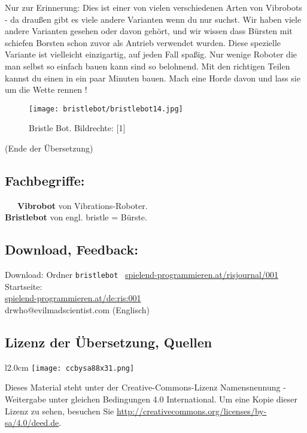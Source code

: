 \documentclass[10pt,a4paper,ngerman,twoside]{article} %
\begin{document}
Nur zur Erinnerung: Dies ist einer von vielen verschiedenen Arten von Vibrobots - da draußen gibt es viele andere Varianten wenn du nur suchst. Wir haben viele andere Varianten gesehen oder davon gehört, und wir wissen dass Bürsten mit schiefen Borsten schon zuvor als Antrieb verwendet wurden. Diese spezielle Variante ist vielleicht einzigartig, auf jeden Fall spaßig. Nur wenige Roboter die man selbst so einfach bauen kann sind so belohnend. Mit den richtigen Teilen kannst du einen in ein paar Minuten bauen. Mach eine Horde davon und lass sie um die Wette rennen !
\
\begin{figure}
\texttt{[image: bristlebot/bristlebot14.jpg]}
\caption{Bristle Bot. Bildrechte: [1]}
\end{figure}

(Ende der Übersetzung) \\

\subsection*{Fachbegriffe:}

~~~\textbf{Vibrobot} von Vibrations-Roboter. \\

\textbf{Bristlebot} von engl. bristle = Bürste. \\

\newpage
\subsection*{Download, Feedback:}
\footnotesize{
Download: Ordner \texttt{bristlebot} \Mundus\ \href{http://spielend-programmieren.at/risjournal/001}{spielend-programmieren.at/risjournal/001}\\
Startseite:\\
\href{http://spielend-programmieren.at/de:ris:001}{spielend-programmieren.at/de:ris:001}\\ 
\Letter\:  drwho@evilmadscientist.com (Englisch) \\}
\normalsize
 

\subsection*{Lizenz der Übersetzung, Quellen}
\begin{wrapfigure}{l}{2.0cm}
\texttt{[image: ccbysa88x31.png]}
\end{wrapfigure}
Dieses Material steht unter der Creative-Commons-Lizenz Namensnennung - Weitergabe unter gleichen Bedingungen 4.0 International. Um eine Kopie dieser Lizenz zu sehen, besuchen Sie \url{http://creativecommons.org/licenses/by-sa/4.0/deed.de}. \\
\end{document}
